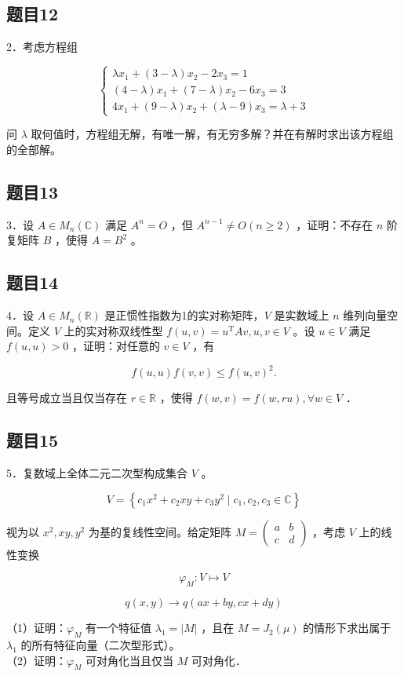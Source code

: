\documentclass{article}
\begin{document}
\subsection{题目12}
2．考虑方程组

\[
\left\{\begin{array}{l}
\lambda x_{1}+(3-\lambda) x_{2}-2 x_{3}=1 \\
(4-\lambda) x_{1}+(7-\lambda) x_{2}-6 x_{3}=3 \\
4 x_{1}+(9-\lambda) x_{2}+(\lambda-9) x_{3}=\lambda+3
\end{array}\right.
\]

问 \(\lambda\) 取何值时，方程组无解，有唯一解，有无穷多解？并在有解时求出该方程组的全部解。

\subsection{题目13}
3．设 \(A \in M_{n}(\mathbb{C})\) 满足 \(A^{n}=O\) ，但 \(A^{n-1} \neq O(n \geq 2)\) ，证明：不存在 \(n\) 阶复矩阵 \(B\) ，使得 \(A=B^{2}\) 。

\subsection{题目14}
4．设 \(A \in M_{n}(\mathbb{R})\) 是正惯性指数为1的实对称矩阵，\(V\) 是实数域上 \(n\) 维列向量空间。定义 \(V\) 上的实对称双线性型 \(f(u, v)=u^{\mathrm{T}} A v, u, v \in V\) 。设 \(u \in V\) 满足 \(f(u, u)>0\) ，证明：对任意的 \(v \in V\) ，有

\[
f(u, u) f(v, v) \leq f(u, v)^{2} .
\]

且等号成立当且仅当存在 \(r \in \mathbb{R}\) ，使得 \(f(w, v)=f(w, r u), \forall w \in V\) ．

\subsection{题目15}
5．复数域上全体二元二次型构成集合 \(V\) 。

\[
V=\left\{c_{1} x^{2}+c_{2} x y+c_{3} y^{2} \mid c_{1}, c_{2}, c_{3} \in \mathbb{C}\right\}
\]

视为以 \(x^{2}, x y, y^{2}\) 为基的复线性空间。给定矩阵 \(M=\left(\begin{array}{cc}a & b \\ c & d\end{array}\right)\) ，考虑 \(V\) 上的线性变换

\[
\varphi_{M}: V \mapsto V
\]

\[
q(x, y) \rightarrow q(a x+b y, c x+d y)
\]

（1）证明：\(\varphi_{M}\) 有一个特征值 \(\lambda_{1}=|M|\) ，且在 \(M=J_{2}(\mu)\) 的情形下求出属于 \(\lambda_{1}\) 的所有特征向量（二次型形式）。\\
（2）证明：\(\varphi_{M}\) 可对角化当且仅当 \(M\) 可对角化．
\end{document}
